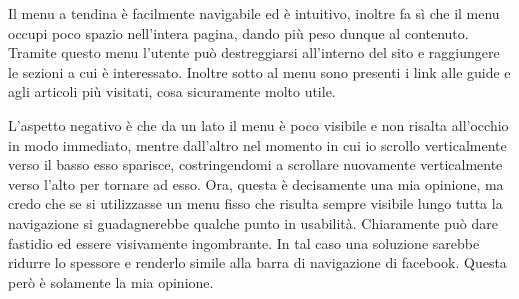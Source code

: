 Il menu a tendina è facilmente navigabile ed è intuitivo, inoltre fa sì che il menu occupi poco spazio nell'intera pagina, dando più peso dunque al contenuto. Tramite questo menu l'utente può destreggiarsi all'interno del sito e raggiungere le sezioni a cui è interessato. Inoltre sotto al menu sono presenti i link alle guide e agli articoli più visitati, cosa sicuramente molto utile.

L'aspetto negativo è che da un lato il menu è poco visibile e non risalta all'occhio in modo immediato, mentre dall'altro nel momento in cui io scrollo verticalmente verso il basso esso sparisce, costringendomi a scrollare nuovamente verticalmente verso l'alto per tornare ad esso. Ora, questa è decisamente una mia opinione, ma credo che se si utilizzasse un menu fisso che risulta sempre visibile lungo tutta la navigazione si guadagnerebbe qualche punto in usabilità. Chiaramente può dare fastidio ed essere visivamente ingombrante. In tal caso una soluzione sarebbe ridurre lo spessore e renderlo simile alla barra di navigazione di facebook. Questa però è solamente la mia opinione.

